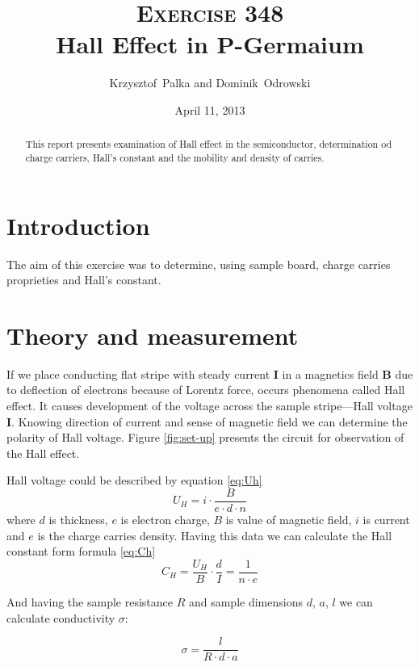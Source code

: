 \documentclass[a4paper,12pt]{article}
\author{Krzysztof~Palka and Dominik~Odrowski}
\date{April 11, 2013}
\title{\textsc{Exercise} 348 \\ Hall Effect in P-Germaium}
\begin{document}
\maketitle

    \begin{abstract}
        This report presents examination of Hall effect in the semiconductor, determination od charge carriers, Hall's constant and the mobility and density of carries.         
    \end{abstract}

    \section{Introduction}
    The aim of this exercise was to determine, using sample board, charge carries proprieties and Hall's constant. 

    \section{Theory and measurement}


    If we place conducting flat stripe with steady current $\mathbf{I}$ in a magnetics field $\mathbf{B}$ due to deflection of electrons because of Lorentz force, occurs phenomena called Hall effect. It causes development of the voltage across the sample stripe---Hall voltage $\mathbf{I}$. Knowing direction of current and sense of magnetic field we can determine the polarity of Hall voltage. Figure \ref{fig:set-up} presents the circuit for observation of the Hall effect.

    Hall voltage could be described by equation \ref{eq:Uh}
    \begin{equation}
        U_H = i \cdot \frac{B}{e \cdot d \cdot n} \label{eq:Uh}
    \end{equation}
    where $d$ is thickness, $e$ is electron charge, $B$ is value of magnetic field, $i$ is current and $e$ is the charge carries density.    
    Having this data we can calculate the Hall constant form formula \ref{eq:Ch}
    \begin{equation}
        C_H = \frac{U_H}{B} \cdot \frac{d}{I} = \frac{1}{n \cdot e} \label{eq:Ch}
    \end{equation}

    And having the sample resistance $R$ and sample dimensions $d$, $a$, $l$ we can calculate conductivity $\sigma$:

    \begin{equation}
        \sigma = \frac{l}{R \cdot d \cdot a} \label{eq:sigma}
    \end{equation}
\end{document}
